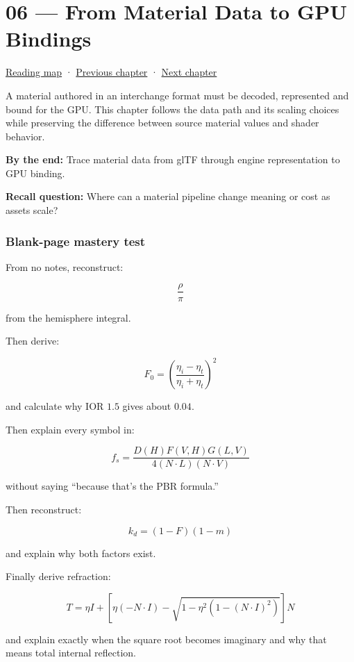 \hypertarget{03-visual-computing-i-ch006}{}
\section{06 --- From Material Data to GPU Bindings}\label{from-material-data-to-gpu-bindings}

\href{Chapter\%20Edition/02\%20-\%20Graphics\%20Vision\%20and\%20XR/00\%20-\%20Reading\%20Map}{Reading map} · \hyperref[03-visual-computing-i-ch005]{Previous chapter} · \hyperref[03-visual-computing-i-ch007]{Next chapter}

A material authored in an interchange format must be decoded, represented and bound for the GPU. This chapter follows the data path and its scaling choices while preserving the difference between source material values and shader behavior.

\textbf{By the end:} Trace material data from glTF through engine representation to GPU binding.

\textbf{Recall question:} Where can a material pipeline change meaning or cost as assets scale?

\subsubsection{Blank-page mastery test}\label{blank-page-mastery-test}

From no notes, reconstruct:

\[
\frac{\rho}{\pi}
\]

from the hemisphere integral.

Then derive:

\[
F_0=
\left(
\frac{\eta_i-\eta_t}
{\eta_i+\eta_t}
\right)^2
\]

and calculate why IOR \(1.5\) gives about \(0.04\).

Then explain every symbol in:

\[
\boxed{
f_s=
\frac{
D(H)F(V,H)G(L,V)
}{
4(N\cdot L)(N\cdot V)
}
}
\]

without saying ``because that's the PBR formula.''

Then reconstruct:

\[
k_d=(1-F)(1-m)
\]

and explain why both factors exist.

Finally derive refraction:

\[
T=
\eta I+
\left[
\eta(-N\cdot I)
-
\sqrt{
1-\eta^2
(1-(N\cdot I)^2)
}
\right]N
\]

and explain exactly when the square root becomes imaginary and why that means total internal reflection.

